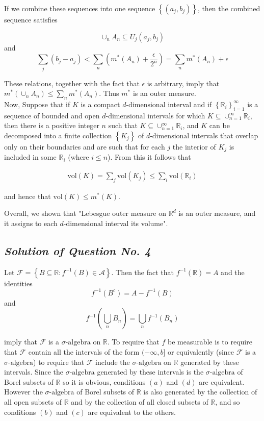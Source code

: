 \documentclass[12pt, a4paper]{article} %
\begin{document}
If we combine these sequences into one sequence $\left\{(a_j,b_j)\right\}$, then the combined sequence satisfies

\[
    \cup_n A_n \subseteq U_j(a_j, b_j)
\]
and
\[
    \sum_{j}^{}\left(b_j - a_j\right) < \sum_{n}^{}\left(m^*(A_n) + \frac{\epsilon}{2^n}\right) = \sum_{n}^{}m^*(A_n) + \epsilon
\]

These relations, together with the fact that $\epsilon$ is arbitrary, imply that $\displaystyle m^*(\cup_n A_n) \leq \sum_{n}^{}m^*(A_n)$. Thus $m^*$ is an outer measure.\\[1mm]

Now, Suppose that if $K$ is a compact $d\mbox{-dimensional}$
interval and if ${\left\{\mathbb{R}_i\right\}}_{i=1}^{\infty}$ is a sequence of bounded and open $d\mbox{-dimensional}$ intervals for which $\displaystyle K \subseteq \cup_{n=1}^{\infty} \mathbb{R}_i$, then there is a positive integer $n$ such that $\displaystyle K \subseteq \cup_{n=1}^{\infty} \mathbb{R}_i$, and $K$ can be decomposed into a finite collection $\left\{K_j\right\}$ of $d\mbox{-dimensional}$ intervals that overlap only on their boundaries and are such that for each $j$ the interior of $K_j$ is included in some $\mathbb{R}_i$ (where $i \leq n$). From this it follows that

\begin{align*}
    \boxed{\mbox{vol}(K) = \sum_{j}^{}\mbox{vol}(K_j) \leq \sum_{i}^{}\mbox{vol}(\mathbb{R}_i)}
\end{align*}

and hence that $\mbox{vol}(K) \leq m^*(K)$.

Overall, we shown that "Lebesgue outer measure on $\mathbb{R}^d$ is an outer measure, and it assigns to each $d\mbox{-dimensional}$ interval its volume".


\subsection{\slshape Solution of Question No. 4}
Let $\mathscr{F} = \left\{B \subseteq \mathbb{R} : f^{-1}(B) \in \mathscr{A} \right\}$. Then the fact that $f^{-1}(\mathbb{R}) = A$ and the identities
\[f^{-1}(B^c) = A - f^{-1}(B)\]
and
\[f^{-1}\left(\bigcup_{n} B_n\right) = \bigcup_{n} f^{-1}(B_n)\]

imply that $\mathscr{F}$ is a $\sigma\mbox{-algebra}$ on $\mathbb{R}$. To require that $f$ be measurable is to require that 
$\mathscr{F}$ contain all the intervals of the form $(-\infty,b]$ or equivalently (since $\mathscr{F}$ is a $\sigma\mbox{-algebra}$) to require that $\mathscr{F}$ include the $\sigma\mbox{-algebra}$ on $\mathbb{R}$ generated by these intervals.
Since the $\sigma\mbox{-algebra}$ generated by these intervals is the $\sigma\mbox{-algebra}$ of Borel subsets of $\mathbb{R}$ so it is obvious, conditions $(a)$ and $(d)$ are equivalent. However the $\sigma\mbox{-algebra}$ of Borel subsets of $\mathbb{R}$ is also generated by the collection of all open subsets of $\mathbb{R}$ and by the collection of all closed subsets of $\mathbb{R}$, and so conditions $(b)$ and $(c)$ are equivalent to the others.
\end{document}
